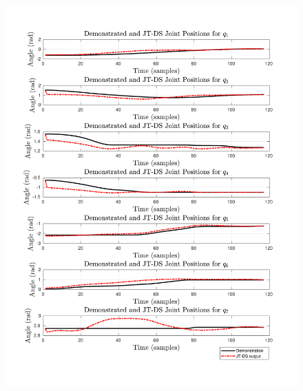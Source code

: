 \documentclass{article}
\begin{document}
\begin{figure}[!th] 
  \begin{minipage}{0.5\textwidth}
     	\centering 
     	\includegraphics[trim={1.2cm 1.5cm 1.7cm 1.5cm},clip,width=\linewidth]{../../src/JTDS_mat_lib/figures/jtd_pos_pour1.pdf}
  \end{minipage}
    \begin{minipage}{0.5\textwidth}
       	\centering 

\end{minipage}
\end{figure}
\end{document}

